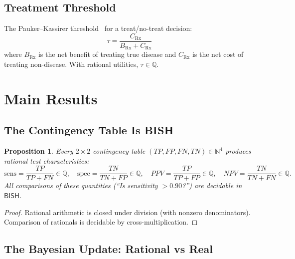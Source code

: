 \documentclass[11pt,a4paper]{article}
\theoremstyle{plain}
\newtheorem{proposition}[theorem]{Proposition}
\theoremstyle{definition}
\newcommand{\BISH}{\textsf{BISH}}
\newcommand{\Q}{\mathbb{Q}}
\newcommand{\N}{\mathbb{N}}
\begin{document}
\subsection{Treatment Threshold}

The Pauker--Kassirer threshold~\cite{pauker-kassirer1980} for a treat/no-treat decision:
\begin{equation}\label{eq:threshold}
  \tau = \frac{C_{\mathrm{Rx}}}{B_{\mathrm{Rx}} + C_{\mathrm{Rx}}}
\end{equation}
where $B_{\mathrm{Rx}}$ is the net benefit of treating true disease and $C_{\mathrm{Rx}}$ is the net cost of treating non-disease.  With rational utilities, $\tau \in \Q$.

\section{Main Results}\label{sec:main}

\subsection{The Contingency Table Is BISH}

\begin{proposition}\label{prop:ct-bish}
Every $2 \times 2$ contingency table $(TP, FP, FN, TN) \in \N^4$ produces rational test characteristics:
\[
  \mathrm{sens} = \frac{TP}{TP + FN} \in \Q, \quad
  \mathrm{spec} = \frac{TN}{TN + FP} \in \Q, \quad
  PPV = \frac{TP}{TP + FP} \in \Q, \quad
  NPV = \frac{TN}{TN + FN} \in \Q.
\]
All comparisons of these quantities (``Is sensitivity $> 0.90$?'') are decidable in $\BISH$.
\end{proposition}

\begin{proof}
Rational arithmetic is closed under division (with nonzero denominators).  Comparison of rationals is decidable by cross-multiplication.
\end{proof}

\subsection{The Bayesian Update: Rational vs Real}
\end{document}
